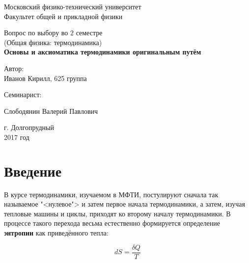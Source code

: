 \documentclass[12pt]{kiarticle}
\newcommand{\del}{\ensuremath{\delta}}
\begin{document}
\begin{titlepage}
	\begin{center}
		\large 	Московский физико-технический университет \\
		Факультет общей и прикладной физики \\
		\vspace{0.2cm}
		
		\vspace{4.5cm}
		Вопрос по выбору во 2 семестре \\ \vspace{0.2cm}
		\large (Общая физика: термодинамика) \\ \vspace{0.2cm}
		\LARGE \textbf{Основы и аксиоматика термодинамики оригинальным путём}
	\end{center}
	\vspace{2.3cm} \large
	
	\begin{center}
		Автор: \\
		Иванов Кирилл,
		625 группа
		\vspace{10mm}
		
		Семинарист: 
		
		Слободянин Валерий Павлович
		
		
	\end{center}
	
	\begin{center} \vspace{50mm}
		г. Долгопрудный \\
		 2017 год
	\end{center}
\end{titlepage}


\section{Введение}

В курсе термодинамики, изучаемом в МФТИ, постулируют сначала так называемое "<нулевое"> и затем первое начала термодинамики, а затем, изучая тепловые машины и циклы, приходят ко второму началу термодинамики. В процессе такого перехода весьма естественно формируется определение \textbf{энтропии} как приведённого тепла: 

\begin{equation}\label{entmipt}
 dS = \dfrac{\del Q}{T}
\end{equation}
\end{document}
